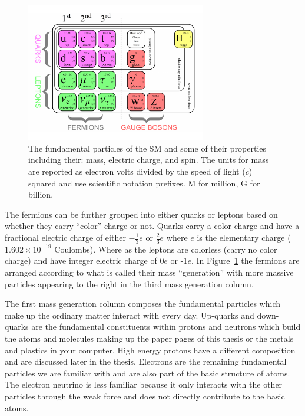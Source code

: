 \begin{figure}[htbp]
\centering
     \includegraphics[width=0.7\textwidth]{introduction/plots/sm_particles.pdf}
     \caption{
The fundamental particles of the SM and some of their properties including their:
mass, electric charge, and spin. The units for mass are reported as electron volts divided by
the speed of light ($c$) squared and use scientific notation prefixes.
M for million, G for billion.
     }
     \label{fig:sm_particles}
\end{figure}

The fermions can be further grouped into either quarks or leptons based on whether
they carry ``color'' charge or not. 
Quarks carry a color charge and have a fractional electric charge of either $-\frac{1}{3}e$ or $\frac{2}{3}e$
where $e$ is the elementary charge ($1.602 \times 10^{-19}$ Coulombs).
Where as the leptons are colorless (carry no color charge) and
have integer electric charge of 0$e$ or -1$e$. In Figure~\ref{fig:sm_particles} the fermions are
arranged according to what is called their mass ``generation'' with more massive
particles appearing to the right in the third mass generation column.

The first
mass generation column composes the fundamental particles which make up the ordinary matter
interact with every day. Up-quarks and down-quarks are the fundamental constituents within
protons and neutrons which build the atoms and molecules
making up the paper pages of this thesis or the metals and plastics in your computer. High energy protons
have a different composition and are discussed later in the thesis. Electrons are the
remaining fundamental particles we are familiar with and are also part of the basic 
structure of atoms. The electron neutrino is less familiar because it only
interacts with the other particles through the weak force and does not directly
contribute to the basic atoms.

